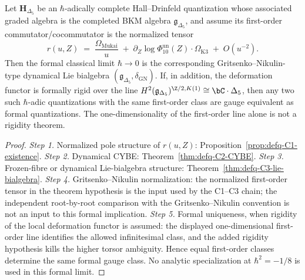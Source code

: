 \begin{theorem}
\label{thm:defq-kazhdan-classical-limit}
\ClaimStatusProvedHere
{}
Let \(\mathbf H_{\Delta_5}\) be an \(\hbar\)-adically complete
Hall--Drinfeld quantization whose associated graded algebra is
the completed BKM algebra \(\mathfrak g_{\Delta_5}\), and assume its
first-order commutator/cocommutator is the normalized tensor
\begin{equation}
\label{eq:defq-classical-limit}
 r(u, Z)
 \;=\;
 \frac{\Omega_{\mathrm{Mukai}}}{u}
 \;+\;
 \partial_Z\log\Phi_{10}^{\mathrm{un}}(Z)\cdot\Omega_{\mathrm{K3}}
 \;+\;
 O(u^{-2}).
\end{equation}
Then the formal classical limit \(\hbar\to0\) is the corresponding
Gritsenko--Nikulin-type dynamical Lie bialgebra
\((\mathfrak g_{\Delta_5},\delta_{\mathrm{GN}})\). If, in addition,
the deformation functor is formally rigid over the line
\(H^2(\mathfrak g_{\Delta_5})^{\Z/2,K(1)}\cong\bC\cdot\Delta_5\),
then any two such \(\hbar\)-adic quantizations with the same
first-order class are gauge equivalent as formal quantizations. The
one-dimensionality of the first-order line alone is not a rigidity
theorem.
\end{theorem}

\begin{proof}
\emph{Step 1.} Normalized pole structure of $r(u, Z)$:
Proposition~\ref{prop:defq-C1-existence}.
\emph{Step 2.} Dynamical CYBE:
Theorem~\ref{thm:defq-C2-CYBE}.
\emph{Step 3.} Frozen-fibre or dynamical Lie-bialgebra structure:
Theorem~\ref{thm:defq-C3-lie-bialgebra}.
\emph{Step 4.} Gritsenko--Nikulin normalization:
the normalized first-order tensor in the theorem hypothesis is the
input used by the C1--C3 chain; the independent root-by-root
comparison with the Gritsenko--Nikulin convention is not an input to
this formal implication.
\emph{Step 5.} Formal uniqueness, when rigidity of the local
deformation functor is assumed:
the displayed one-dimensional first-order line identifies the allowed
infinitesimal class, and the added rigidity hypothesis kills the
higher torsor ambiguity. Hence equal first-order classes determine the
same formal gauge class. No analytic specialization at
\(\hbar^2=-1/8\) is used in this formal limit.
\end{proof}

